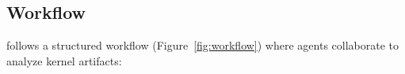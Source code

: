 \subsection{Workflow}

\sys follows a structured workflow (Figure~\ref{fig:workflow}) where agents collaborate to analyze kernel artifacts:

% 
% 
% 
% 
